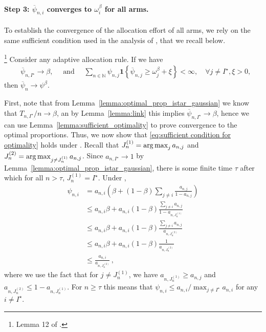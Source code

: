 \paragraph{Step 3: $\overline{\psi}_{n,i}$ converges to $\omega_i^\beta$ for all arms.} To establish the convergence of the allocation effort of all arms, we rely on the same sufficient condition used in the analysis of \cite{russo2016ttts}, that we recall below. 

\begin{lemma}\label{lemma:sufficient_optimality}
\begin{leftbar}\footnote{Lemma 12 of \cite{russo2016ttts}.}
Consider any adaptive allocation rule. If we have
	\begin{align}\label{eq:sufficient condition for optimality}
		&\overline{\psi}_{n, I^\star} \rightarrow \beta, \quad \text{ and } \quad
		\sum_{n \in \mathbb{N}} \psi_{n,j} \bm{1} \left\lbrace \overline{\psi}_{n,j} \geq \omega_j^\beta + \xi \right\rbrace < \infty, \quad \forall j \neq I^\star, \xi > 0,
	\end{align}
then $\overline{\psi}_{n} \rightarrow \psi^\beta$.
\end{leftbar}
\end{lemma}

First, note that from Lemma~\ref{lemma:optimal_prop_istar_gaussian} we know that $T_{n,I^\star}/n \rightarrow \beta$, an by Lemma~\ref{lemma:link} this implies $\overline{\psi}_{n, I^\star} \rightarrow \beta$, hence we can use Lemma~\ref{lemma:sufficient_optimality} to prove convergence to the optimal proportions. Thus, we now show that \eqref{eq:sufficient condition for optimality} holds under \TTTS. Recall that $J_n^{(1)} = \operatorname*{arg\,max}_{j} a_{n,j}$ and $J_n^{(2)} = \operatorname*{arg\,max}_{j\neq J_n^{(1)}} a_{n,j}$. Since $a_{n,I^\star} \rightarrow 1$ by Lemma~\ref{lemma:optimal_prop_istar_gaussian}, there is some finite time $\tau$ after which for all $n > \tau$, $J_n^{(1)} = I^\star$. Under \TTTS, 
	\begin{align*}
	\psi_{n,i} &= a_{n,i} \left( \beta  + (1-\beta) \sum_{j \neq i} \frac{a_{n,j}}{1-a_{n,j}} \right) \\
	           &\leq a_{n,i} \beta  + a_{n,i} (1-\beta) \frac{\sum_{j \neq i} a_{n,j}}{1-a_{n,J_n^{(1)}}} \\
	           &\leq  a_{n,i} \beta + a_{n,i} (1-\beta) \frac{\sum_{j \neq i} a_{n,j}}{a_{n,J_n^{(2)}}} \\
	           &\leq a_{n,i}\beta  + a_{n,i} (1-\beta) \frac{1}{a_{n,J_n^{(2)}}} \\
	           &\leq \frac{a_{n,i}}{a_{n,J_n^{(2)}}}\,,
	\end{align*}
where we use the fact that for $j \neq J_n^{(1)}$, we have $a_{n,J_n^{(1)}} \geq a_{n,j}$ and $a_{n,J_n^{(2)}} \leq 1- a_{n,J_n^{(1)}}$. For $n \geq \tau$ this means that $\psi_{n, i} \leq a_{n,i} / \max_{j \neq I^\star} a_{n,i}$ for any $i \neq I^\star$.
	
